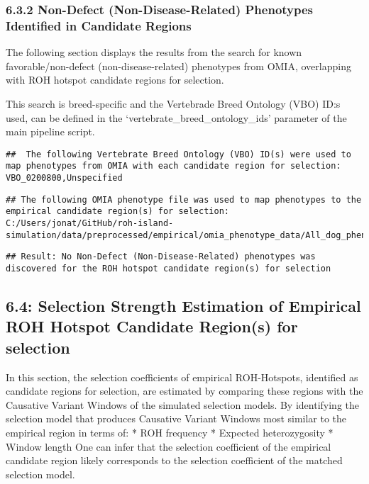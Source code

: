 \documentclass[
]{article}
\begin{document}
\subsubsection{6.3.2 Non-Defect (Non-Disease-Related) Phenotypes
Identified in Candidate
Regions}\label{non-defect-non-disease-related-phenotypes-identified-in-candidate-regions}

The following section displays the results from the search for known
favorable/non-defect (non-disease-related) phenotypes from OMIA,
overlapping with ROH hotspot candidate regions for selection.

This search is breed-specific and the Vertebrade Breed Ontology (VBO)
ID:s used, can be defined in the `vertebrate\_breed\_ontology\_ids'
parameter of the main pipeline script.

\begin{verbatim}
##  The following Vertebrate Breed Ontology (VBO) ID(s) were used to map phenotypes from OMIA with each candidate region for selection: VBO_0200800,Unspecified
\end{verbatim}

\begin{verbatim}
## The following OMIA phenotype file was used to map phenotypes to the empirical candidate region(s) for selection: C:/Users/jonat/GitHub/roh-island-simulation/data/preprocessed/empirical/omia_phenotype_data/All_dog_phenotypes.bed
\end{verbatim}

\begin{verbatim}
## Result: No Non-Defect (Non-Disease-Related) phenotypes was discovered for the ROH hotspot candidate region(s) for selection
\end{verbatim}

\subsection{6.4: Selection Strength Estimation of Empirical ROH Hotspot
Candidate Region(s) for
selection}\label{selection-strength-estimation-of-empirical-roh-hotspot-candidate-regions-for-selection}

In this section, the selection coefficients of empirical ROH-Hotspots,
identified as candidate regions for selection, are estimated by
comparing these regions with the Causative Variant Windows of the
simulated selection models. By identifying the selection model that
produces Causative Variant Windows most similar to the empirical region
in terms of: * ROH frequency * Expected heterozygosity * Window length
One can infer that the selection coefficient of the empirical candidate
region likely corresponds to the selection coefficient of the matched
selection model.
\end{document}
